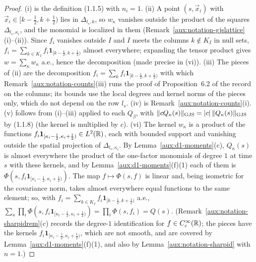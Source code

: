 \begin{proof}
(i) is the definition (1.1.5) with $n_i=1$.  (ii) A point $(s,\vec x_i)$ with
$\vec x_i\in[k-\frac12,k+\frac12)$ lies in $\Delta_{l_s,k}$, so $w_\kappa$ vanishes outside the
product of the squares $\Delta_{l_s,\kappa_i}$, and the monomial is localized in them
(Remark~\ref{aux:notation-gjslattice}(i)--(ii)).  Since $f_i$ vanishes outside $I$ and $I$ meets
the columns $k\notin K_I$ in null sets, $f_i=\sum_{k\in K_I}f_i\mathbf
1_{[k-\frac12,k+\frac12)}$ almost everywhere; expanding the tensor product gives
$w=\sum_\kappa w_\kappa$ a.e., hence the decomposition (made precise in (vi)).  (iii) The pieces of
(ii) are the decomposition $f_i=\sum_kf_i\mathbf 1_{[k-\frac12,k+\frac12)}$ with which
Remark~\ref{aux:notation-counts}(iii) runs the proof of Proposition~6.2 of the record on the
columns; its bounds use the local degrees and kernel norms of the pieces only, which do not
depend on the row $l_s$.  (iv) is Remark~\ref{aux:notation-counts}(i).  (v) follows from
(i)--(iii) applied to each $Q_\beta$, with $\lVert cQ_\kappa(s)\rVert_{\mathrm{GJS}}=|c|\,\lVert Q_\kappa(s)\rVert_{\mathrm{GJS}}$ by
(1.1.8) (the kernel is multiplied by $c$).  (vi) The kernel $w_\kappa$ is a product of the
functions $f_i\mathbf 1_{[\kappa_i-\frac12,\kappa_i+\frac12)}\in L^2(\mathbb{R})$, each with bounded support
and vanishing outside the spatial projection of $\Delta_{l_s,\kappa_i}$.  By
Lemma~\ref{aux:d1-moments}(c), $Q_\kappa(s)$ is almost everywhere the product of the one-factor
monomials of degree $1$ at time $s$ with these kernels, and by Lemma~\ref{aux:d1-moments}(f)(1)
each of them is $\Phi(s,f_i\mathbf 1_{[\kappa_i-\frac12,\kappa_i+\frac12)})$.  The map
$f\mapsto\Phi(s,f)$ is linear and, being isometric for the covariance norm, takes almost
everywhere equal functions to the same element; so, with $f_i=\sum_{k\in K_I}f_i\mathbf
1_{[k-\frac12,k+\frac12)}$ a.e.,
$\sum_\kappa\prod_i\Phi(s,f_i\mathbf 1_{[\kappa_i-\frac12,\kappa_i+\frac12)})=
\prod_i\Phi(s,f_i)=Q(s)$.  (Remark~\ref{aux:notation-sharpidrem}(c) records the degree-$1$
identification for $f\in C_c^\infty(\mathbb{R})$; the pieces have the kernels
$f_i\mathbf 1_{[\kappa_i-\frac12,\kappa_i+\frac12)}$, which are not smooth, and are covered by
Lemma~\ref{aux:d1-moments}(f)(1), and also by Lemma~\ref{aux:notation-sharpid} with $n=1$.)
\end{proof}

